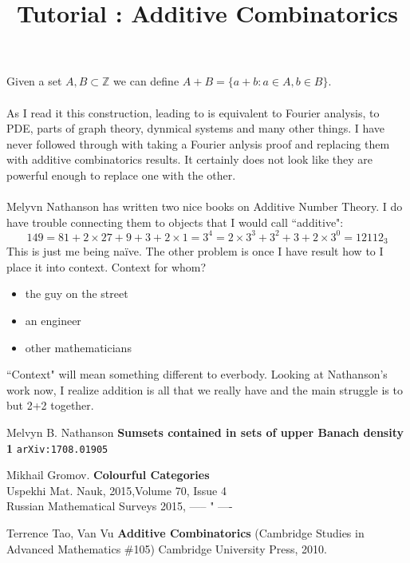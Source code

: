 \documentclass[12pt]{article}
\title{Tutorial : Additive Combinatorics}
\date{}
\begin{document}
\selectfont \fontsize{12.5}{15}\selectfont

\maketitle

\noindent Given a set $A, B \subset \mathbb{Z}$ we can define $A + B = \{ a + b: a \in A , b \in B \}$.  \\ \\
As I read it this construction, leading to {\color{yellow!60!black}} is equivalent to Fourier analysis, to PDE, parts of graph theory, dynmical systems and many other things.  I have never followed through with taking a Fourier anlysis proof and replacing them with additive combinatorics results.  It certainly does not look like they are powerful enough to replace one with the other. \\ \\
Melyvn Nathanson has written two nice books on Additive Number Theory.  I do have trouble connecting them to objects that I would call ``additive": 
$$ 149 = 81 + 2 \times 27 + 9 + 3 + 2 \times 1= 3^4 = 2 \times 3^3 + 3^2 + 3 + 2 \times 3^0 =  12112_3 $$
This is just me being na\"{i}ve.  The other problem is once I have result how to I place it into context.  Context for whom?
\begin{itemize}
\item the guy on the street
\item an engineer
\item other mathematicians
\end{itemize}
``Context" will mean something different to everbody.  Looking at Nathanson's work now, I realize addition is all that we really have and the main struggle is to but 2+2 together.

\vfill

\begin{thebibliography}{}

\item  Melvyn B. Nathanson \textbf{Sumsets contained in sets of upper Banach density 1} \texttt{arXiv:1708.01905}

\item Mikhail Gromov. \textbf{Colourful Categories} \\
Uspekhi Mat. Nauk, 	\hspace{0.85in} 2015,Volume 70,	Issue 4	\\
Russian Mathematical Surveys 2015, ----- " ----

\item Terrence Tao, Van Vu \textbf{Additive Combinatorics} (Cambridge Studies in Advanced Mathematics \#105) Cambridge University Press, 2010. 

\end{thebibliography}
\end{document}
